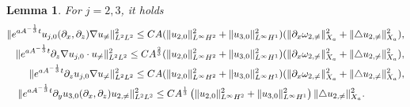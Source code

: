 \documentclass[12pt, reqno]{amsart}
\newtheorem{lemma}{Lemma}[section]
\numberwithin{equation}{section}
\begin{document}
	\begin{lemma}\label{lemma_neq3}
		For $j=2,3$, it holds 
		\begin{equation}\label{eq:zeroneq0}
			\begin{aligned}
				\|{\rm e}^{aA^{-\frac{1}{3}}t}u_{j,0}(\partial_x,\partial_z)
				\nabla u_{\neq}\|_{L^2L^2}^2\leq 
				CA(\|u_{2,0}\|^2_{L^{\infty}H^2}+\|u_{3,0}\|^2_{L^{\infty}H^1})(\|\partial_x\omega_{2,\neq}\|^2_{X_a}
				+\|\triangle u_{2,\neq}\|^2_{X_a}),\\
				\|{\rm e}^{aA^{-\frac{1}{3}}t}\partial_z\nabla u_{j,0}
				\cdot u_{\neq}\|_{L^2L^2}^2\leq CA^{\frac23}(\|u_{2,0}\|^2_{L^{\infty}H^2}+\|u_{3,0}\|^2_{L^{\infty}H^1})(\|\partial_x\omega_{2,\neq}\|^2_{X_a}
				+\|\triangle u_{2,\neq}\|^2_{X_a}),\\
				\|{\rm e}^{aA^{-\frac{1}{3}}t}\partial_z u_{j,0}
				\nabla u_{\neq}\|_{L^2L^2}^2\leq CA(\|u_{2,0}\|^2_{L^{\infty}H^2}+\|u_{3,0}\|^2_{L^{\infty}H^1})(\|\partial_x\omega_{2,\neq}\|^2_{X_a}
				+\|\triangle u_{2,\neq}\|^2_{X_a}),\\
				\|e^{aA^{-\frac13}t}\partial_{y}u_{3,0}(\partial_{x},\partial_{z})u_{2,\neq}\|_{L^{2}L^{2}}^{2}\leq CA^{\frac13}\left(\|u_{2,0}\|_{L^{\infty}H^{2}}^{2}+\|u_{3,0}\|_{L^{\infty}H^{1}}^{2} \right)\|\triangle u_{2,\neq}\|_{X_{a}}^{2}.\quad\quad\quad\quad
			\end{aligned}
		\end{equation}
	\end{lemma}
\end{document}
